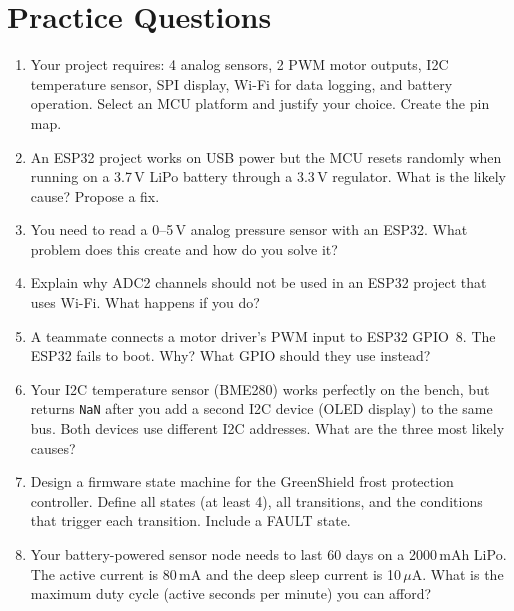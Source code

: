 \documentclass[11pt,letterpaper,twoside,openany]{book}
\begin{document}
\section{Practice Questions}
\begin{enumerate}[leftmargin=1.5em]
\item Your project requires: 4 analog sensors, 2 PWM motor outputs, I2C temperature sensor, SPI display, Wi-Fi for data logging, and battery operation. Select an MCU platform and justify your choice. Create the pin map.
\item An ESP32 project works on USB power but the MCU resets randomly when running on a 3.7\,V LiPo battery through a 3.3\,V regulator. What is the likely cause? Propose a fix.
\item You need to read a 0--5\,V analog pressure sensor with an ESP32. What problem does this create and how do you solve it?
\item Explain why ADC2 channels should not be used in an ESP32 project that uses Wi-Fi. What happens if you do?
\item A teammate connects a motor driver's PWM input to ESP32 GPIO~8. The ESP32 fails to boot. Why? What GPIO should they use instead?
\item Your I2C temperature sensor (BME280) works perfectly on the bench, but returns \texttt{NaN} after you add a second I2C device (OLED display) to the same bus. Both devices use different I2C addresses. What are the three most likely causes?
\item Design a firmware state machine for the GreenShield frost protection controller. Define all states (at least 4), all transitions, and the conditions that trigger each transition. Include a FAULT state.
\item Your battery-powered sensor node needs to last 60 days on a 2000\,mAh LiPo. The active current is 80\,mA and the deep sleep current is 10\,$\mu$A. What is the maximum duty cycle (active seconds per minute) you can afford?
\end{enumerate}
\end{document}
